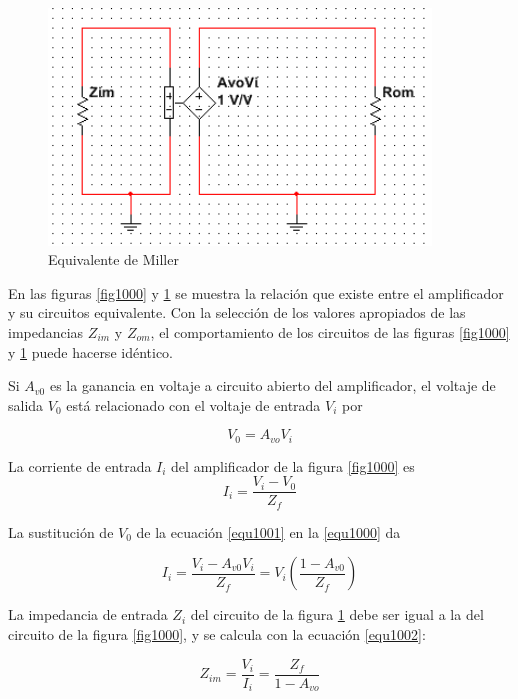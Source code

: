 \documentclass[12pt]{book}
\theoremstyle{definition}
\theoremstyle{remark}
\theoremstyle{plain}
\begin{document}
\begin{figure}
\centering
\includegraphics[width=4in]{EquivalenteMiller.png}
\caption{Equivalente de Miller}
\label{fig1001}
\end{figure}

En las figuras \ref{fig1000} y \ref{fig1001} se muestra la relación que existe entre el amplificador y su circuitos equivalente. Con la selección de los valores apropiados de las impedancias $Z_{im}$ y $Z_{om}$, el comportamiento de los circuitos de las figuras \ref{fig1000} y \ref{fig1001} puede hacerse idéntico. 

Si $A_{v0}$ es la ganancia en voltaje a circuito abierto del amplificador, el voltaje de salida $V_0$ está relacionado con el voltaje de entrada $V_i$ por


\begin{equation}
\label{equ1000}
V_0=A_{vo} V_i
\end{equation}

La corriente de entrada $I_i$ del amplificador de la figura \ref{fig1000} es
\begin{equation}
\label{equ1001}
I_{i}=\frac{V_{i}-V_{0}}{Z_{f}}
\end{equation}

La sustitución de $V_{0}$ de la ecuación \ref{equ1001} en la \ref{equ1000} da

\begin{equation}
\label{equ1002}
I_{i}=\frac{V_{i}-A_{v0}V_{i}}{Z_{f}}=V_{i}(\frac{1-A_{v0}}{Z_{f}})
\end{equation}

La impedancia de entrada $Z_{i}$ del circuito de la figura \ref{fig1001} debe ser igual a la del circuito de la figura \ref{fig1000}, y se calcula con la ecuación \ref{equ1002}:

\begin{equation}
\label{equ1003}
Z_{im}=\frac{V_{i}}{I_{i}}=\frac{Z_{f}}{1-A_{vo}}
\end{equation}
\end{document}
